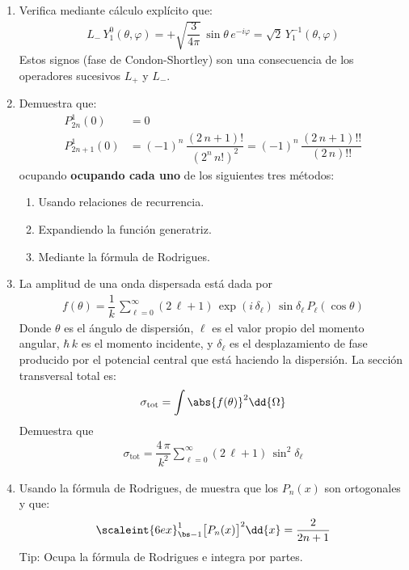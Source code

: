 \begin{enumerate}
\begin{enumerate}[label=\roman*)]
\end{enumerate}
\item Verifica mediante cálculo explícito que:
\begin{align*}
L_{-} \, Y_{1}^{0} (\theta, \varphi) = + \sqrt{\dfrac{3}{4 \pi}} \, \sin \theta \, e^{-i \varphi} = \sqrt{2} \, Y_{1}^{-1} (\theta, \varphi)
\end{align*}
Estos signos (fase de Condon-Shortley) son una consecuencia de los operadores sucesivos $L_{+}$ y $L_{-}$.
\item Demuestra que:
\begin{align*}
P_{2n}^{1} (0) &= 0 \\[0.5em]
P_{2n+1}^{1} (0) &= (-1)^{n} \, \dfrac{(2 \, n +1)!}{(2^{n} \, n!)^{2}} = (-1)^{n} \, \dfrac{(2 \, n + 1)!!}{(2 \, n)!!}
\end{align*}
ocupando \textbf{ocupando cada uno} de los siguientes tres métodos:
\begin{enumerate}[label=(\alph*)]
\item Usando relaciones de recurrencia.
\item Expandiendo la función generatriz.
\item Mediante la fórmula de Rodrigues.
\end{enumerate}
\item La amplitud de una onda dispersada está dada por
\begin{align*}
f(\theta) = \dfrac{1}{k} \, \sum_{\ell = 0}^{\infty} (2 \, \ell + 1) \, \exp(i \, \delta_{\ell}) \, \sin \delta_{\ell} \, P_{\ell} (\cos \theta)
\end{align*}
Donde $\theta$ es el ángulo de dispersión, $\ell$ es el valor propio del momento angular, $\hbar \, k$ es el momento incidente, y $\delta_{\ell}$ es el desplazamiento de fase producido por el potencial central que está haciendo la dispersión. La sección transversal total es:
\begin{align*}
\sigma_{\text{tot}} = \int \abs{f(\theta)}^{2} \dd{\Omega}
\end{align*}
Demuestra que
\begin{align*}
\sigma_{\text{tot}} = \dfrac{4 \, \pi}{k^{2}} \sum_{\ell=0}^{\infty} (2 \, \ell + 1) \, \sin^{2} \delta_{\ell}
\end{align*}
\item Usando la fórmula de Rodrigues, de muestra que los $P_{n} (x)$ son ortogonales y que:
\begin{align*}
\scaleint{6ex}_{\bs -1}^{1} \big[ P_{n} (x) \big]^{2} \dd{x} = \dfrac{2}{2 n + 1}
\end{align*}
Tip: Ocupa la fórmula de Rodrigues e integra por partes.

\end{enumerate}

